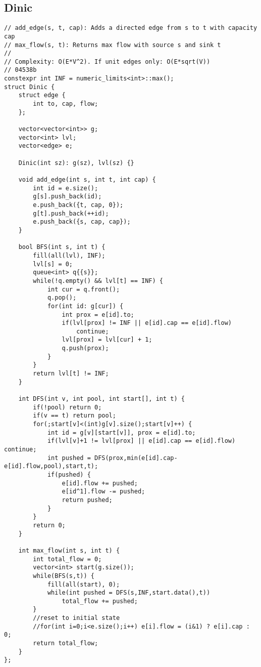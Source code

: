 \documentclass{article}
\begin{document}
\subsection{Dinic}
\begin{verbatim}
// add_edge(s, t, cap): Adds a directed edge from s to t with capacity cap
// max_flow(s, t): Returns max flow with source s and sink t
//
// Complexity: O(E*V^2). If unit edges only: O(E*sqrt(V))
// 04538b
constexpr int INF = numeric_limits<int>::max();
struct Dinic {
	struct edge {
		int to, cap, flow;
	};

	vector<vector<int>> g;
	vector<int> lvl;
	vector<edge> e;

	Dinic(int sz): g(sz), lvl(sz) {}

	void add_edge(int s, int t, int cap) {
		int id = e.size();
		g[s].push_back(id);
		e.push_back({t, cap, 0});
		g[t].push_back(++id);
		e.push_back({s, cap, cap});
	}

	bool BFS(int s, int t) {
		fill(all(lvl), INF);
		lvl[s] = 0;
		queue<int> q{{s}};
		while(!q.empty() && lvl[t] == INF) {
			int cur = q.front();
			q.pop();
			for(int id: g[cur]) {
				int prox = e[id].to;
				if(lvl[prox] != INF || e[id].cap == e[id].flow)
					continue;
				lvl[prox] = lvl[cur] + 1;
				q.push(prox);
			}
		}
		return lvl[t] != INF;
	}

	int DFS(int v, int pool, int start[], int t) {
		if(!pool) return 0;
		if(v == t) return pool;
		for(;start[v]<(int)g[v].size();start[v]++) {
			int id = g[v][start[v]], prox = e[id].to;
			if(lvl[v]+1 != lvl[prox] || e[id].cap == e[id].flow) continue;
			int pushed = DFS(prox,min(e[id].cap-e[id].flow,pool),start,t);
			if(pushed) {
				e[id].flow += pushed;
				e[id^1].flow -= pushed;
				return pushed;
			}
		}
		return 0;
	}

	int max_flow(int s, int t) {
		int total_flow = 0;
		vector<int> start(g.size());
		while(BFS(s,t)) {
			fill(all(start), 0);
			while(int pushed = DFS(s,INF,start.data(),t)) 
				total_flow += pushed;
		}
		//reset to initial state
		//for(int i=0;i<e.size();i++) e[i].flow = (i&1) ? e[i].cap : 0;
		return total_flow;
	}
};
\end{verbatim}
\end{document}
